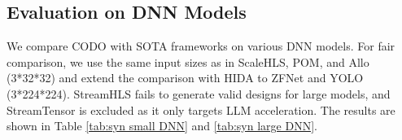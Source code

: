 \documentclass[conference]{IEEEtran}
\begin{document}






\subsection{Evaluation on DNN Models}\label{Evaluation on CNN Models}
\label{sec:dnn}
We compare CODO with SOTA frameworks on various DNN models.
For fair comparison, we use the same input sizes as in ScaleHLS, POM, and Allo (3*32*32) and extend the comparison with HIDA to ZFNet and YOLO (3*224*224). StreamHLS fails to generate valid designs for large models, and StreamTensor is excluded as it only targets LLM acceleration.
The results are shown in Table \ref{tab:syn small DNN} and \ref{tab:syn large DNN}. 
\end{document}
